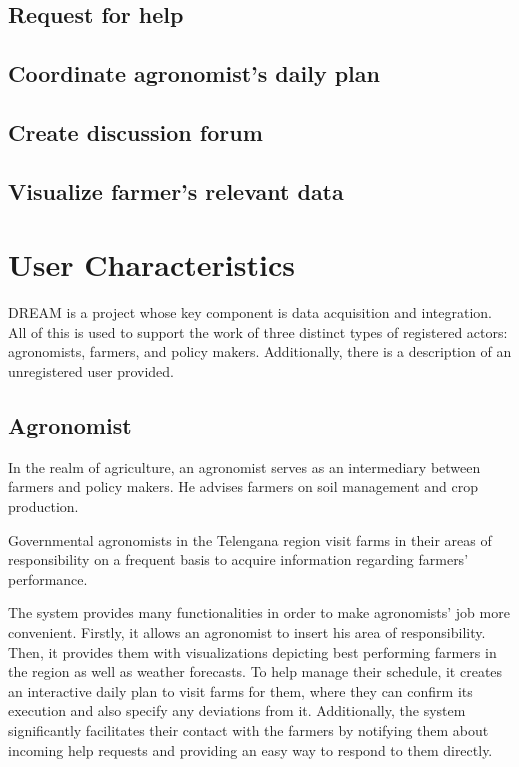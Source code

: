 \subsection{Request for help}

\subsection{Coordinate agronomist's daily plan}

\subsection{Create discussion forum}

\subsection{Visualize farmer's relevant data}

\section{User Characteristics}

DREAM is a project whose key component is data acquisition and integration. All of this is used to support the work of three distinct types of registered actors: agronomists, farmers, and policy makers. Additionally, there is a description of an unregistered user provided.

\subsection{Agronomist}

In the realm of agriculture, an agronomist serves as an intermediary between farmers and policy makers. He advises farmers on soil management and crop production.

Governmental agronomists in the Telengana region visit farms in their areas of responsibility on a frequent basis to acquire information regarding farmers' performance.

The system provides many functionalities in order to make agronomists' job more convenient. Firstly, it allows an agronomist to insert his area of responsibility. Then, it provides them with visualizations depicting best performing farmers in the region as well as weather forecasts. To help manage their schedule, it creates an interactive daily plan to visit farms for them, where they can confirm its execution and also specify any deviations from it. Additionally, the system significantly facilitates their contact with the farmers by notifying them about incoming help requests and providing an easy way to respond to them directly.

